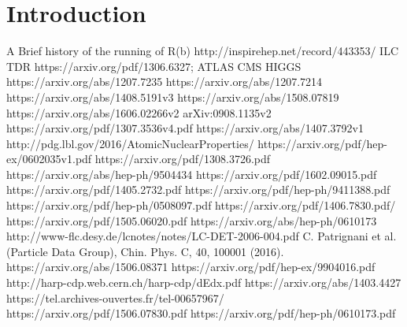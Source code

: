 \documentclass[a4paper, 12pt]{article}
\begin{document}
\part{Introduction}
%
%
%
%


% 
\begin{thebibliography}{100} 
 A Brief history of the running of R(b) http://inspirehep.net/record/443353/
 ILC TDR https://arxiv.org/pdf/1306.6327;
 ATLAS CMS HIGGS 
https://arxiv.org/abs/1207.7235
 https://arxiv.org/abs/1207.7214
  https://arxiv.org/abs/1408.5191v3
 https://arxiv.org/abs/1508.07819
 https://arxiv.org/abs/1606.02266v2
  arXiv:0908.1135v2
 https://arxiv.org/pdf/1307.3536v4.pdf
 https://arxiv.org/abs/1407.3792v1
 http://pdg.lbl.gov/2016/AtomicNuclearProperties/
 https://arxiv.org/pdf/hep-ex/0602035v1.pdf
https://arxiv.org/pdf/1308.3726.pdf
 https://arxiv.org/abs/hep-ph/9504434
 https://arxiv.org/pdf/1602.09015.pdf
 https://arxiv.org/pdf/1405.2732.pdf
 https://arxiv.org/pdf/hep-ph/9411388.pdf
https://arxiv.org/pdf/hep-ph/0508097.pdf
 https://arxiv.org/pdf/1406.7830.pdf/
https://arxiv.org/pdf/1505.06020.pdf
https://arxiv.org/abs/hep-ph/0610173
http://www-flc.desy.de/lcnotes/notes/LC-DET-2006-004.pdf
C. Patrignani et al. (Particle Data Group), Chin. Phys. C, 40, 100001 (2016).
 https://arxiv.org/abs/1506.08371
 https://arxiv.org/pdf/hep-ex/9904016.pdf
 http://harp-cdp.web.cern.ch/harp-cdp/dEdx.pdf
 https://arxiv.org/abs/1403.4427
 https://tel.archives-ouvertes.fr/tel-00657967/
https://arxiv.org/pdf/1506.07830.pdf
https://arxiv.org/pdf/hep-ph/0610173.pdf
\end{thebibliography}
\end{document}
